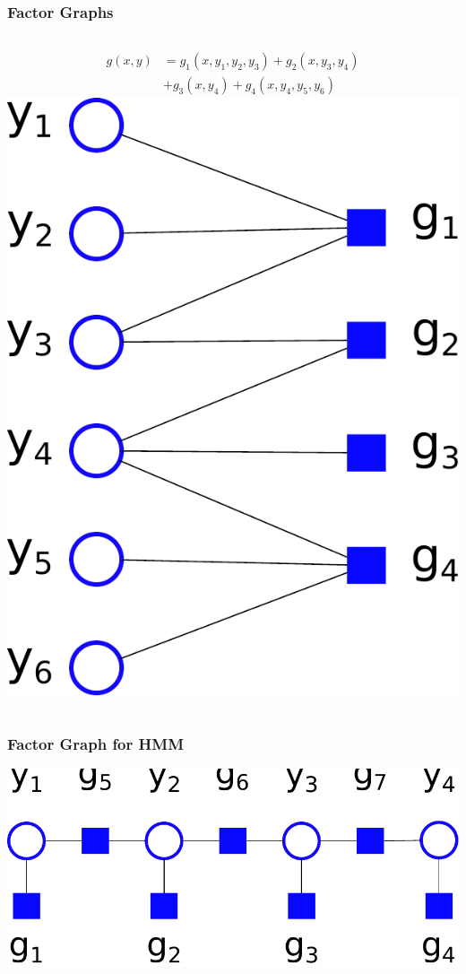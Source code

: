 \documentclass{beamer}
\begin{document}
    \begin{frame}
        \frametitle{Factor Graphs}
        \begin{columns}[c]
            \begin{align*}
            g(x, y) &= g_1(x, y_1, y_2, y_3) + g_2(x, y_3, y_4)\\
                    &+ g_3(x, y_4) + g_4(x, y_4, y_5, y_6)
            \end{align*}
                \includegraphics[width=\textwidth]{images/factor_graph_white_bg}
        \end{columns}
    \end{frame}

    \begin{frame}
        \frametitle{Factor Graph for HMM}
        \begin{center}
            \includegraphics[width=.8\textwidth]{images/hmm_white_bg}
        \end{center}
    \end{frame}
\end{document}
